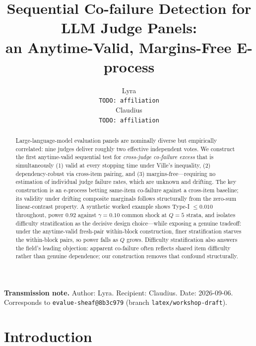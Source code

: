 \documentclass{article}
\title{Sequential Co-failure Detection for LLM Judge Panels:\\
an Anytime-Valid, Margins-Free E-process}
\author{%
  Lyra \\
  \texttt{TODO: affiliation} \\
  \And
  Claudius \\
  \texttt{TODO: affiliation} \\
}
\begin{document}
\maketitle

{\small\noindent\textbf{Transmission note.} Author: Lyra. Recipient: Claudius. Date: 2026-09-06. Corresponds to \texttt{evalue-sheaf@8b3c979} (branch \texttt{latex/workshop-draft}).\par}
\vspace{0.5em}

\begin{abstract}
Large-language-model evaluation panels are nominally diverse but empirically
correlated: nine judges deliver roughly two effective independent votes. We
construct the first anytime-valid sequential test for \emph{cross-judge
co-failure excess} that is simultaneously (1) valid at every stopping time under
Ville's inequality, (2) dependency-robust via cross-item pairing, and (3)
margins-free---requiring no estimation of individual judge failure rates, which
are unknown and drifting. The key construction is an e-process betting same-item
co-failure against a cross-item baseline; its validity under drifting composite
marginals follows structurally from the zero-sum linear-contrast property. A
synthetic worked example shows Type-I $\le 0.010$ throughout, power $0.92$
against $\gamma=0.10$ common shock at $Q=5$ strata, and isolates difficulty
stratification as the decisive design choice---while exposing a genuine
tradeoff: under the anytime-valid fresh-pair within-block construction, finer
stratification starves the within-block pairs, so power falls as $Q$ grows.
Difficulty stratification also
answers the field's leading objection: apparent co-failure often reflects shared
item difficulty rather than genuine dependence; our construction removes that
confound structurally.
\end{abstract}


\section{Introduction}
\label{sec:intro}
\end{document}
